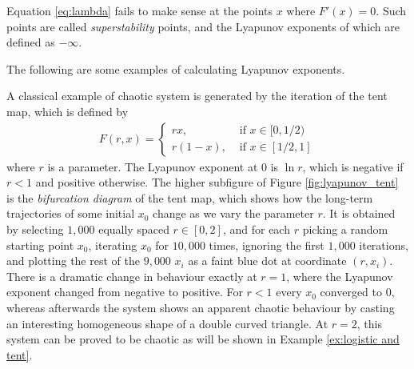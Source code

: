 Equation \eqref{eq:lambda} fails to make sense at the points $x$ where $F'(x) = 0$.
Such points are called \emph{superstability} points, and the Lyapunov exponents of which are defined as $- \infty$.

The following are some examples of calculating Lyapunov exponents.

\begin{exmp}
	A classical example of chaotic system is generated by the iteration of the tent map, which is defined by
    \begin{align}
        F(r, x)= 
        \begin{cases}
            r x, & \text{ if } x \in [0,1/2) \\
            r (1-x), & \text{ if } x \in [1/2,1]
        \end{cases} \label{eq:tent}
    \end{align}
    where $r$ is a parameter.
	The Lyapunov exponent at $0$ is $\ln r$, which is negative if $r < 1$ and positive otherwise.
	The higher subfigure of Figure \ref{fig:lyapunov_tent} is the \textit{bifurcation diagram} of the tent map, which shows how the long-term trajectories of some initial $x_0$ change as we vary the parameter $r$. 
	It is obtained by selecting $1,000$ equally spaced $r \in [0,2]$, and for each $r$ picking a random starting point $x_0$, iterating $x_0$ for $10,000$ times, ignoring the first $1,000$ iterations, and plotting the rest of the $9,000$ $ x_i$ as a faint blue dot at coordinate $(r, x_i)$. 
	There is a dramatic change in behaviour exactly at $r=1$, where the Lyapunov exponent changed from negative to positive.
    For $r < 1$ every $x_0$ converged to $0$, whereas afterwards the system shows an apparent chaotic behaviour by casting an interesting homogeneous shape of a double curved triangle. At $r = 2$, this system can be proved to be chaotic as will be shown in Example \ref{ex:logistic and tent}.


\end{exmp}

